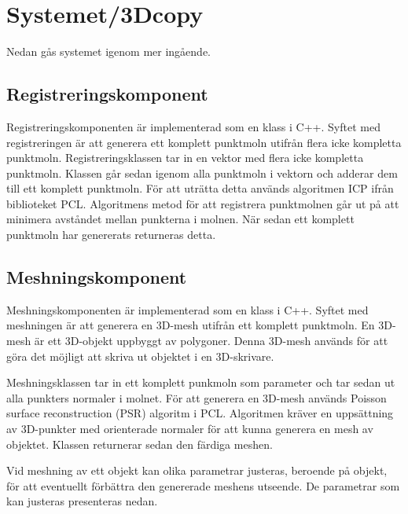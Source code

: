 \documentclass[a4paper,titlepage,12pt]{article}
\begin{document}
\section{Systemet/3Dcopy} %
	Nedan gås systemet igenom mer ingående.
	
	\subsection{Registreringskomponent}
		Registreringskomponenten är implementerad som en klass i C++. Syftet med registreringen är att generera ett komplett punktmoln utifrån flera icke kompletta punktmoln. Registreringsklassen tar in en vektor med flera icke kompletta punktmoln. Klassen går sedan igenom alla punktmoln i vektorn och adderar dem till ett komplett punktmoln. För att uträtta detta används algoritmen ICP ifrån biblioteket PCL. Algoritmens metod för att registrera punktmolnen går ut på att minimera avståndet mellan punkterna i molnen. När sedan ett komplett punktmoln har genererats returneras detta.
	
	\subsection{Meshningskomponent}
		Meshningskomponenten är implementerad som en klass i C++. Syftet med meshningen är att generera en 3D-mesh utifrån ett komplett punktmoln. En 3D-mesh är ett 3D-objekt uppbyggt av polygoner. Denna 3D-mesh används för att göra det möjligt att skriva ut objektet i en 3D-skrivare. 
		
		Meshningsklassen tar in ett komplett punkmoln som parameter och tar sedan ut alla punkters normaler i molnet. För att generera en 3D-mesh används Poisson surface reconstruction (PSR) algoritm i PCL. Algoritmen kräver en uppsättning av 3D-punkter med orienterade normaler för att kunna generera en mesh av objektet. Klassen returnerar sedan den färdiga meshen.
		
		Vid meshning av ett objekt kan olika parametrar justeras, beroende på objekt, för att eventuellt förbättra den genererade meshens utseende. De parametrar som kan justeras presenteras nedan.
		
\end{document}
